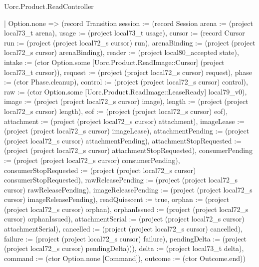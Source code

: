 \begin{lexlean}{Uorc.Product.ReadController}
\begin{semanticmodule}
{      | Option.none => (record Transition {session := (record Session {arena := (project local73_t arena), usage := (project local73_t usage), cursor := (record Cursor {run := (project (project local72_s cursor) run), arenaBinding := (project (project local72_s cursor) arenaBinding), reader := (project local80_accepted state), intake := (ctor Option.some [Uorc.Product.ReadImage::Cursor] (project local73_t cursor)), request := (project (project local72_s cursor) request), phase := (ctor Phase.cleanup), control := (project (project local72_s cursor) control), raw := (ctor Option.some [Uorc.Product.ReadImage::LeaseReady] local79_v0), image := (project (project local72_s cursor) image), length := (project (project local72_s cursor) length), eof := (project (project local72_s cursor) eof), attachment := (project (project local72_s cursor) attachment), imageLease := (project (project local72_s cursor) imageLease), attachmentPending := (project (project local72_s cursor) attachmentPending), attachmentStopRequested := (project (project local72_s cursor) attachmentStopRequested), consumerPending := (project (project local72_s cursor) consumerPending), consumerStopRequested := (project (project local72_s cursor) consumerStopRequested), rawReleasePending := (project (project local72_s cursor) rawReleasePending), imageReleasePending := (project (project local72_s cursor) imageReleasePending), readQuiescent := true, orphan := (project (project local72_s cursor) orphan), orphanIssued := (project (project local72_s cursor) orphanIssued), attachmentSerial := (project (project local72_s cursor) attachmentSerial), cancelled := (project (project local72_s cursor) cancelled), failure := (project (project local72_s cursor) failure), pendingDelta := (project (project local72_s cursor) pendingDelta)})}), delta := (project local73_t delta), command := (ctor Option.none [Command]), outcome := (ctor Outcome.end)})
}
\end{semanticmodule}
\end{lexlean}
